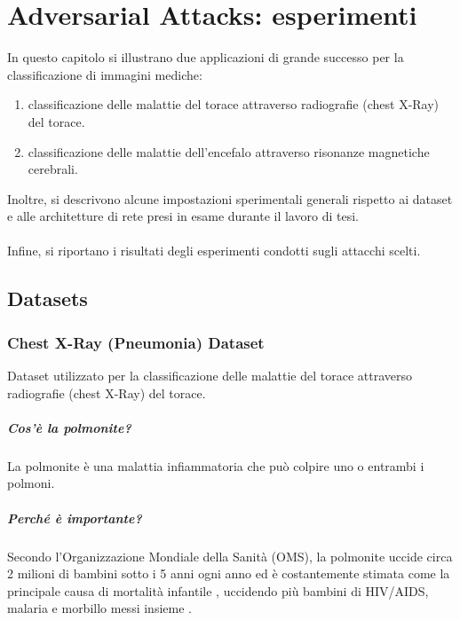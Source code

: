 \chapter{Adversarial Attacks: esperimenti}
\label{chap:4}

In questo capitolo si illustrano due applicazioni di grande successo per la classificazione di immagini mediche:
\begin{enumerate}
    \item classificazione delle malattie del torace attraverso radiografie (chest X-Ray) del torace.
    \item classificazione delle malattie dell'encefalo attraverso risonanze magnetiche cerebrali.
\end{enumerate}
Inoltre, si descrivono alcune impostazioni sperimentali generali rispetto ai dataset e alle architetture di rete presi in esame durante il lavoro di tesi. \\\\
Infine, si riportano i risultati degli esperimenti condotti sugli attacchi scelti. 
\newpage

\section{Datasets}

    \subsection{Chest X-Ray (Pneumonia) Dataset}
        Dataset utilizzato per la classificazione delle malattie del torace attraverso radiografie (chest X-Ray) del torace.
        
        \paragraph{Cos'è la polmonite?}
        La polmonite è una malattia infiammatoria che può colpire uno o entrambi i polmoni.
        
        \paragraph{Perché è importante?} 
        Secondo l'Organizzazione Mondiale della Sanità (OMS), la polmonite uccide circa 2 milioni di bambini sotto i 5 anni ogni anno ed è costantemente stimata come la principale causa di mortalità infantile \cite{rudan2008epidemiology}, uccidendo più bambini di HIV/AIDS, malaria e morbillo messi insieme \cite{adegbola2012childhood}.
        
